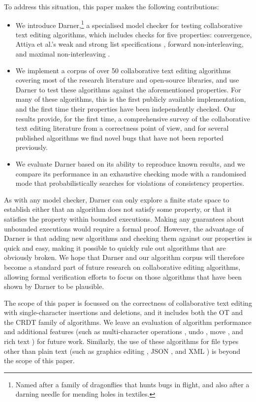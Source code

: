 \documentclass[sigplan,10pt,review,anonymous]{acmart}
\begin{document}
To address this situation, this paper makes the following contributions:
\begin{itemize}
    \item We introduce Darner,\footnote{Named after a family of dragonflies that hunts bugs in flight, and also after a darning needle for mending holes in textiles.} a specialised model checker for testing collaborative text editing algorithms, which includes checks for five properties: convergence, Attiya et al.'s weak and strong list specifications \cite{Attiya2016}, forward non-interleaving, and maximal non-interleaving \cite{Weidner2025Fugue}.
    \item We implement a corpus of over 50 collaborative text editing algorithms covering most of the research literature and open-source libraries, and use Darner to test these algorithms against the aforementioned properties.
        For many of these algorithms, this is the first publicly available implementation, and the first time their properties have been independently checked.
        Our results provide, for the first time, a comprehensive survey of the collaborative text editing literature from a correctness point of view, and for several published algorithms we find novel bugs that have not been reported previously.
    \item We evaluate Darner based on its ability to reproduce known results, and we compare its performance in an exhaustive checking mode with a randomised mode that probabilistically searches for violations of consistency properties.
\end{itemize}

As with any model checker, Darner can only explore a finite state space to establish either that an algorithm does not satisfy some property, or that it satisfies the property within bounded executions.
Making any guarantees about unbounded executions would require a formal proof.
However, the advantage of Darner is that adding new algorithms and checking them against our properties is quick and easy, making it possible to quickly rule out algorithms that are obviously broken.
We hope that Darner and our algorithm corpus will therefore become a standard part of future research on collaborative editing algorithms, allowing formal verification efforts to focus on those algorithms that have been shown by Darner to be plausible.

The scope of this paper is focussed on the correctness of collaborative text editing with single-character insertions and deletions, and it includes both the OT and the CRDT family of algorithms.
We leave an evaluation of algorithm performance and additional features (such as multi-character operations \cite{Lv2016}, undo \cite{Ressel1999}, move \cite{Kleppmann2020}, and rich text \cite{Litt2022}) for future work.
Similarly, the use of these algorithms for file types other than plain text (such as graphics editing \cite{Sun2002}, JSON \cite{Kleppmann2017}, and XML \cite{Davis2002}) is beyond the scope of this paper.
\end{document}
